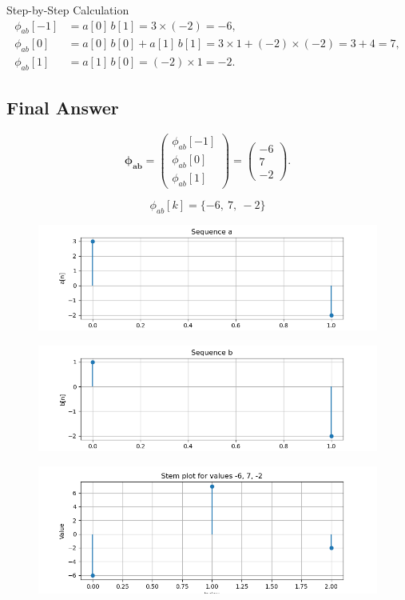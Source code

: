 \documentclass{beamer}
\theoremstyle{remark}
\newcommand{\myvec}[1]{\ensuremath{\begin{pmatrix}#1\end{pmatrix}}}
\numberwithin{equation}{section}
\begin{document}
     \begin{frame}{ Step-by-Step Calculation}    
\[
\begin{aligned}
\phi_{ab}[-1] &= a[0]\,b[1] = 3 \times (-2) = -6, \\
\phi_{ab}[0]  &= a[0]\,b[0] + a[1]\,b[1] = 3\times 1 + (-2)\times (-2) = 3 + 4 = 7, \\
\phi_{ab}[1]  &= a[1]\,b[0] = (-2)\times 1 = -2.
\end{aligned}
\]

\subsection*{Final Answer}

\[
\boldsymbol{{\phi}_{ab}}=
\myvec{
\phi_{ab}[-1]\\[0.4em]
\phi_{ab}[0]\\[0.4em]
\phi_{ab}[1]
}
=
\myvec{
-6\\[0.4em]
7\\[0.4em]
-2
}.
\]

\[
\boxed{\phi_{ab}[k] = \{-6,\ 7,\ -2\}}
\] 
     \end{frame}
       \begin{frame}[fragile]
    \begin{figure}[H]
    \centering
    \includegraphics[width = 0.6\columnwidth]{../figs/img1.png}
    \caption*{}
    \label{figs}
\end{figure}
\end{frame}
  \begin{frame}[fragile]
    \begin{figure}[H]
    \centering
    \includegraphics[width = 0.6\columnwidth]{../figs/img2.png}
    \caption*{}
    \label{figs}
\end{figure}
\end{frame}
  \begin{frame}[fragile]
    \begin{figure}[H]
    \centering
    \includegraphics[width = 0.6\columnwidth]{../figs/img3.png}
    \caption*{}
    \label{figs}
\end{figure}
\end{frame}
\end{document}
